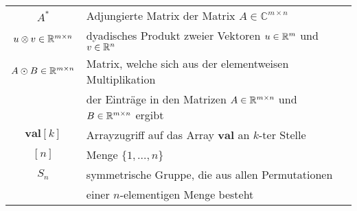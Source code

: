 \begin{tabular}{cp{}}
    $A^*$ & Adjungierte Matrix der Matrix $A \in \mathbb{C}^{m \times n}$\\ 
    $u \otimes v \in \mathbb{R}^{m \times n}$ & dyadisches Produkt zweier Vektoren $u \in \mathbb{R}^m$ und $v \in \mathbb{R}^n$ \\
    $A \odot B \in \mathbb{R}^{m \times n}$ & Matrix, welche sich aus der elementweisen Multiplikation \\ & der Einträge in den Matrizen $A \in \mathbb{R}^{m \times n}$ und $B \in \mathbb{R}^{m \times n}$ ergibt \\
    $\mathbf{val}[k]$ & Arrayzugriff auf das Array $\mathbf{val}$ an $k$-ter Stelle \\
    $[n]$ & Menge $\{1, \ldots, n\}$ \\
    $S_n$ & symmetrische Gruppe, die aus allen Permutationen \\ &einer $n$-elementigen Menge besteht 
\end{tabular}